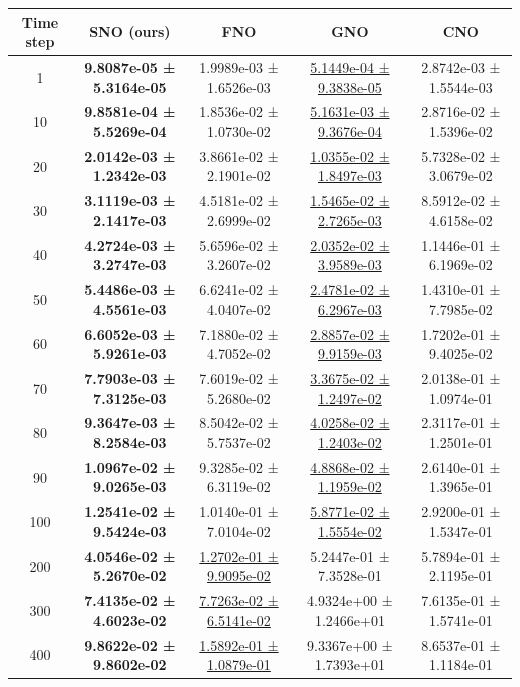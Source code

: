 \documentclass{article}
\theoremstyle{plain}
\theoremstyle{definition}
\theoremstyle{remark}
\begin{document}
\begin{table}[htbp]
\centering
\small
\setlength{\tabcolsep}{6pt}
\begin{tabular}{ccccc}
\hline
Time step & SNO (ours) & FNO & GNO & CNO \\
\hline
1   & \textbf{9.8087e-05 ± 5.3164e-05} & 1.9989e-03 ± 1.6526e-03 & \underline{5.1449e-04 ± 9.3838e-05} & 2.8742e-03 ± 1.5544e-03 \\
10  & \textbf{9.8581e-04 ± 5.5269e-04} & 1.8536e-02 ± 1.0730e-02 & \underline{5.1631e-03 ± 9.3676e-04} & 2.8716e-02 ± 1.5396e-02 \\
20  & \textbf{2.0142e-03 ± 1.2342e-03} & 3.8661e-02 ± 2.1901e-02 & \underline{1.0355e-02 ± 1.8497e-03} & 5.7328e-02 ± 3.0679e-02 \\
30  & \textbf{3.1119e-03 ± 2.1417e-03} & 4.5181e-02 ± 2.6999e-02 & \underline{1.5465e-02 ± 2.7265e-03} & 8.5912e-02 ± 4.6158e-02 \\
40  & \textbf{4.2724e-03 ± 3.2747e-03} & 5.6596e-02 ± 3.2607e-02 & \underline{2.0352e-02 ± 3.9589e-03} & 1.1446e-01 ± 6.1969e-02 \\
50  & \textbf{5.4486e-03 ± 4.5561e-03} & 6.6241e-02 ± 4.0407e-02 & \underline{2.4781e-02 ± 6.2967e-03} & 1.4310e-01 ± 7.7985e-02 \\
60  & \textbf{6.6052e-03 ± 5.9261e-03} & 7.1880e-02 ± 4.7052e-02 & \underline{2.8857e-02 ± 9.9159e-03} & 1.7202e-01 ± 9.4025e-02 \\
70  & \textbf{7.7903e-03 ± 7.3125e-03} & 7.6019e-02 ± 5.2680e-02 & \underline{3.3675e-02 ± 1.2497e-02} & 2.0138e-01 ± 1.0974e-01 \\
80  & \textbf{9.3647e-03 ± 8.2584e-03} & 8.5042e-02 ± 5.7537e-02 & \underline{4.0258e-02 ± 1.2403e-02} & 2.3117e-01 ± 1.2501e-01 \\
90  & \textbf{1.0967e-02 ± 9.0265e-03} & 9.3285e-02 ± 6.3119e-02 & \underline{4.8868e-02 ± 1.1959e-02} & 2.6140e-01 ± 1.3965e-01 \\
100 & \textbf{1.2541e-02 ± 9.5424e-03} & 1.0140e-01 ± 7.0104e-02 & \underline{5.8771e-02 ± 1.5554e-02} & 2.9200e-01 ± 1.5347e-01 \\
200 & \textbf{4.0546e-02 ± 5.2670e-02} & \underline{1.2702e-01 ± 9.9095e-02} & 5.2447e-01 ± 7.3528e-01 & 5.7894e-01 ± 2.1195e-01 \\
300 & \textbf{7.4135e-02 ± 4.6023e-02} & \underline{7.7263e-02 ± 6.5141e-02} & 4.9324e+00 ± 1.2466e+01 & 7.6135e-01 ± 1.5741e-01 \\
400 & \textbf{9.8622e-02 ± 9.8602e-02} & \underline{1.5892e-01 ± 1.0879e-01} & 9.3367e+00 ± 1.7393e+01 & 8.6537e-01 ± 1.1184e-01 \\

\end{tabular}
\end{table}
\end{document}
